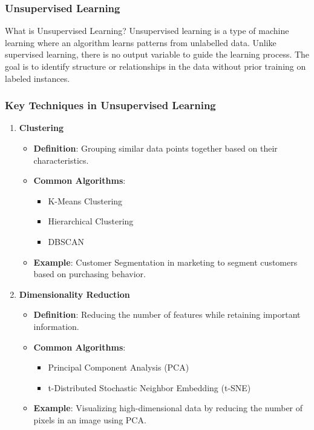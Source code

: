 \documentclass[aspectratio=169]{beamer}
\begin{document}
\begin{frame}[fragile]
    \frametitle{Unsupervised Learning}
    \begin{block}{What is Unsupervised Learning?}
        Unsupervised learning is a type of machine learning where an algorithm learns patterns from unlabelled data. Unlike supervised learning, there is no output variable to guide the learning process. The goal is to identify structure or relationships in the data without prior training on labeled instances.
    \end{block}
\end{frame}

\begin{frame}[fragile]
    \frametitle{Key Techniques in Unsupervised Learning}
    \begin{enumerate}
        \item \textbf{Clustering}
            \begin{itemize}
                \item \textbf{Definition}: Grouping similar data points together based on their characteristics.
                \item \textbf{Common Algorithms}:
                    \begin{itemize}
                        \item K-Means Clustering
                        \item Hierarchical Clustering
                        \item DBSCAN
                    \end{itemize}
                \item \textbf{Example}: Customer Segmentation in marketing to segment customers based on purchasing behavior.
            \end{itemize}
        
        \item \textbf{Dimensionality Reduction}
            \begin{itemize}
                \item \textbf{Definition}: Reducing the number of features while retaining important information.
                \item \textbf{Common Algorithms}:
                    \begin{itemize}
                        \item Principal Component Analysis (PCA)
                        \item t-Distributed Stochastic Neighbor Embedding (t-SNE)
                    \end{itemize}
                \item \textbf{Example}: Visualizing high-dimensional data by reducing the number of pixels in an image using PCA.
            \end{itemize}
    \end{enumerate}
\end{frame}
\end{document}
